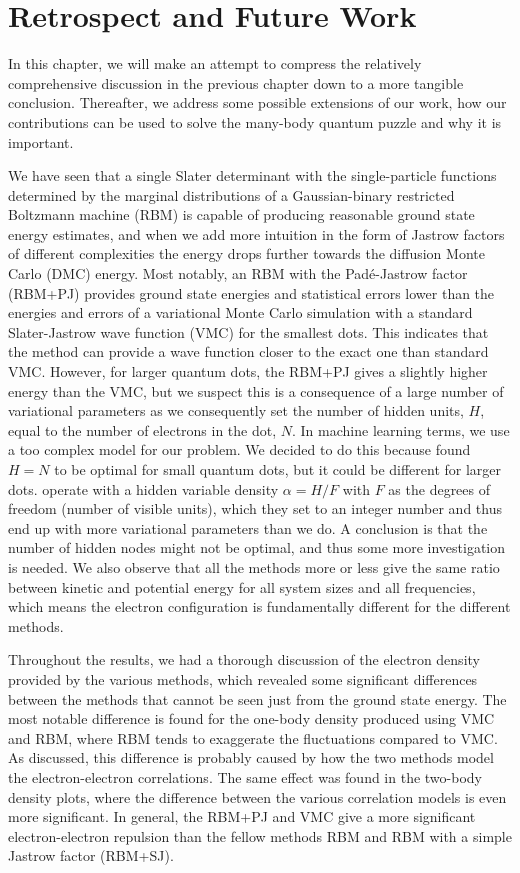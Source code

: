 \chapter{Retrospect and Future Work} \label{sec:conclusion}
In this chapter, we will make an attempt to compress the relatively comprehensive discussion in the previous chapter down to a more tangible conclusion. Thereafter, we address some possible extensions of our work, how our contributions can be used to solve the many-body quantum puzzle and why it is important. 

We have seen that a single Slater determinant with the single-particle functions determined by the marginal distributions of a Gaussian-binary restricted Boltzmann machine (RBM) is capable of producing reasonable ground state energy estimates, and when we add more intuition in the form of Jastrow factors of different complexities the energy drops further towards the diffusion Monte Carlo (DMC) energy. Most notably, an RBM with the Padé-Jastrow  factor (RBM+PJ) provides ground state energies and statistical errors lower than the energies and errors of a variational Monte Carlo simulation with a standard Slater-Jastrow wave function (VMC) for the smallest dots. This indicates that the method can provide a wave function closer to the exact one than standard VMC. However, for larger quantum dots, the RBM+PJ gives a slightly higher energy than the VMC, but we suspect this is a consequence of a large number of variational parameters as we consequently set the number of hidden units, $H$, equal to the number of electrons in the dot, $N$. In machine learning terms, we use a too complex model for our problem. We decided to do this because \citet{nordhagen_computational_2018} found $H=N$ to be optimal for small quantum dots, but it could be different for larger dots. \citet{carleo_solving_2017} operate with a hidden variable density $\alpha=H/F$ with $F$ as the degrees of freedom (number of visible units), which they set to an integer number and thus end up with more variational parameters than we do. A conclusion is that the number of hidden nodes might not be optimal, and thus some more investigation is needed. We also observe that all the methods more or less give the same ratio between kinetic and potential energy for all system sizes and all frequencies, which means the electron configuration is fundamentally different for the different methods.

Throughout the results, we had a thorough discussion of the electron density provided by the various methods, which revealed some significant differences between the methods that cannot be seen just from the ground state energy. The most notable difference is found for the one-body density produced using VMC and RBM, where RBM tends to exaggerate the fluctuations compared to VMC. As discussed, this difference is probably caused by how the two methods model the electron-electron correlations. The same effect was found in the two-body density plots, where the difference between the various correlation models is even more significant. In general, the RBM+PJ and VMC give a more significant electron-electron repulsion than the fellow methods RBM and RBM with a simple Jastrow factor (RBM+SJ).

